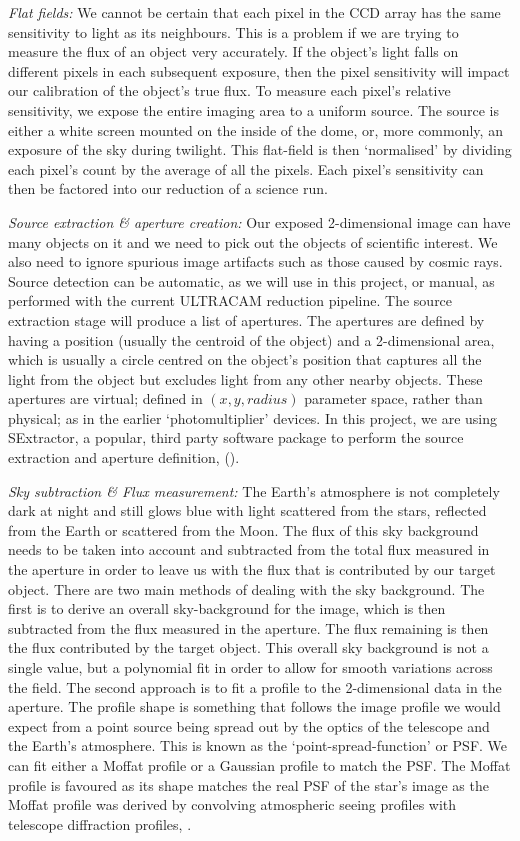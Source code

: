 \emph{Flat fields:}
We cannot be certain that each pixel in the CCD array has the same sensitivity to light as its neighbours. This is a problem if we are trying to measure the flux of an object very accurately. If the object's light falls on different pixels in each subsequent exposure, then the pixel sensitivity will impact our calibration of the object's true flux. To measure each pixel's relative sensitivity, we expose the entire imaging area to a uniform source. The source is either a white screen mounted on the inside of the dome, or, more commonly, an exposure of the sky during twilight. This flat-field is then `normalised' by dividing each pixel's count by the average of all the pixels. Each pixel's sensitivity can then be factored into our reduction of a science run. 

\emph{Source extraction \& aperture creation:}
Our exposed 2-dimensional image can have many objects on it and we need to pick out the objects of scientific interest. We also need to ignore spurious image artifacts such as those caused by cosmic rays. Source detection can be automatic, as we will use in this project, or manual, as performed with the current ULTRACAM reduction pipeline. The source extraction stage will produce a list of apertures. The apertures are defined by having a position (usually the centroid of the object) and a 2-dimensional area, which is usually a circle centred on the object's position that captures all the light from the object but excludes light from any other nearby objects. These apertures are virtual; defined in $(x, y, radius)$ parameter space, rather than physical; as in the earlier `photomultiplier' devices. In this project, we are using {SExtractor}, a popular, third party software package to perform the source extraction and aperture definition, (\cite{bertin}).

\emph{Sky subtraction \& Flux measurement:}
The Earth's atmosphere is not completely dark at night and still glows blue with light scattered from the stars, reflected from the Earth or scattered from the Moon. The flux of this sky background needs to be taken into account and subtracted from the total flux measured in the aperture in order to leave us with the flux that is contributed by our target object. There are two main methods of dealing with the sky background. The first is to derive an overall sky-background for the image, which is then subtracted from the flux measured in the aperture. The flux remaining is then the flux contributed by the target object. This overall sky background is not a single value, but a polynomial fit in order to allow for smooth variations across the field. The second approach is to fit a profile to the 2-dimensional data in the aperture. The profile shape is something that follows the image profile we would expect from a point source being spread out by the optics of the telescope and the Earth's atmosphere. This is known as the `point-spread-function' or {PSF}. We can fit either a Moffat profile or a Gaussian profile to match the PSF. The Moffat profile is favoured as its shape matches the real PSF of the star's image as the Moffat profile was derived by convolving atmospheric seeing profiles with telescope diffraction profiles, \citep{Moffat69}. 

